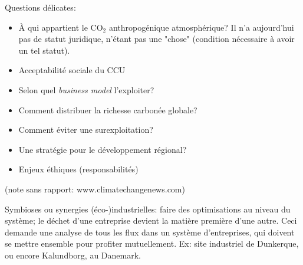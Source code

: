 \documentclass{article}
\begin{document}
Questions délicates:
\begin{itemize}
	\item À qui appartient le CO$_2$ anthropogénique atmosphérique? Il n'a aujourd'hui pas de statut juridique, n'étant pas une "chose" (condition nécessaire à avoir un tel statut).
	\item Acceptabilité sociale du CCU
	\item Selon quel \emph{business model} l'exploiter?
	\item Comment distribuer la richesse carbonée globale?
	\item Comment éviter une surexploitation?
	\item Une stratégie pour le développement régional?
	\item Enjeux éthiques (responsabilités)
\end{itemize}

 (note sans rapport: www.climatechangenews.com) \par
 Symbioses ou synergies (éco-)industrielles: faire des optimisations au niveau du système; le déchet d'une entreprise devient la matière première d'une autre. Ceci demande une analyse de tous les flux dans un système d'entreprises, qui doivent se mettre ensemble pour profiter mutuellement. Ex: site industriel de Dunkerque, ou encore Kalundborg, au Danemark.
\end{document}
